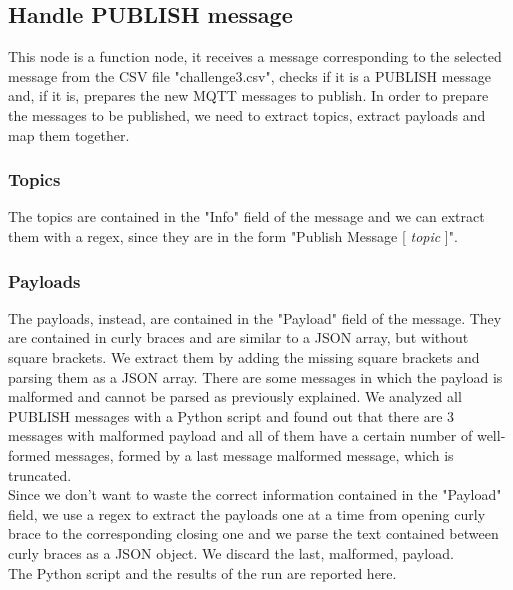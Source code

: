 \subsection{Handle PUBLISH message}
This node is a function node, it receives a message corresponding to the selected message from the CSV file "challenge3.csv", checks if it is a PUBLISH message and, if it is, prepares the new MQTT messages to publish. In order to prepare the messages to be published, we need to extract topics, extract payloads and map them together. 

\subsubsection{Topics}
The topics are contained in the "Info" field of the message and we can extract them with a regex, since they are in the form "Publish Message [	\textit{topic }]".

\subsubsection{Payloads}
The payloads, instead, are contained in the "Payload" field of the message. They are contained in curly braces and are similar to a JSON array, but without square brackets. 
We extract them by adding the missing square brackets and parsing them as a JSON array. There are some messages in which the payload is malformed and cannot be parsed as previously explained. We analyzed all PUBLISH messages with a Python script and found out that there are 3 messages with malformed payload and all of them have a certain number of well-formed messages, formed by a last message malformed message, which is truncated.\\
Since we don't want to waste the correct information contained in the "Payload" field, we use a regex to extract the payloads one at a time from opening curly brace to the corresponding closing one and we parse the text contained between curly braces as a JSON object. We discard the last, malformed, payload.\\
The Python script and the results of the run are reported here.

